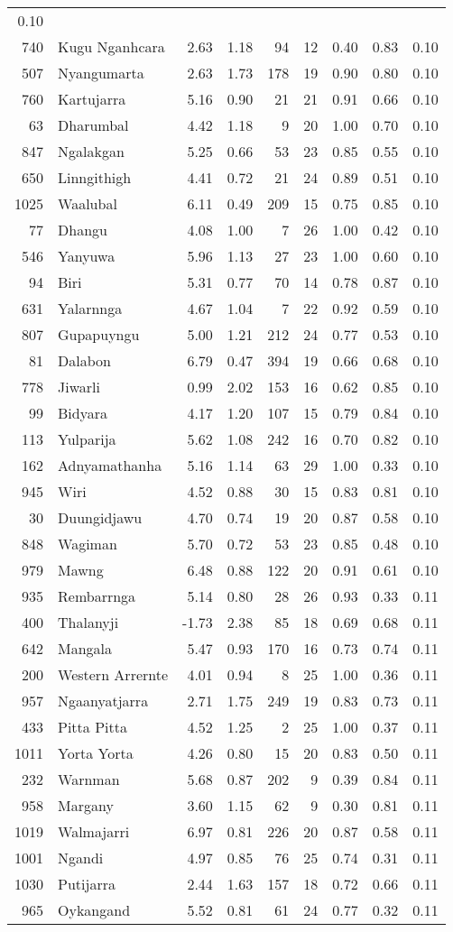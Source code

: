 \begin{longtable}[]{@{}rlrrrrrrr@{}}
0.10\tabularnewline
740 & Kugu Nganhcara & 2.63 & 1.18 & 94 & 12 & 0.40 & 0.83 &
0.10\tabularnewline
507 & Nyangumarta & 2.63 & 1.73 & 178 & 19 & 0.90 & 0.80 &
0.10\tabularnewline
760 & Kartujarra & 5.16 & 0.90 & 21 & 21 & 0.91 & 0.66 &
0.10\tabularnewline
63 & Dharumbal & 4.42 & 1.18 & 9 & 20 & 1.00 & 0.70 &
0.10\tabularnewline
847 & Ngalakgan & 5.25 & 0.66 & 53 & 23 & 0.85 & 0.55 &
0.10\tabularnewline
650 & Linngithigh & 4.41 & 0.72 & 21 & 24 & 0.89 & 0.51 &
0.10\tabularnewline
1025 & Waalubal & 6.11 & 0.49 & 209 & 15 & 0.75 & 0.85 &
0.10\tabularnewline
77 & Dhangu & 4.08 & 1.00 & 7 & 26 & 1.00 & 0.42 & 0.10\tabularnewline
546 & Yanyuwa & 5.96 & 1.13 & 27 & 23 & 1.00 & 0.60 &
0.10\tabularnewline
94 & Biri & 5.31 & 0.77 & 70 & 14 & 0.78 & 0.87 & 0.10\tabularnewline
631 & Yalarnnga & 4.67 & 1.04 & 7 & 22 & 0.92 & 0.59 &
0.10\tabularnewline
807 & Gupapuyngu & 5.00 & 1.21 & 212 & 24 & 0.77 & 0.53 &
0.10\tabularnewline
81 & Dalabon & 6.79 & 0.47 & 394 & 19 & 0.66 & 0.68 &
0.10\tabularnewline
778 & Jiwarli & 0.99 & 2.02 & 153 & 16 & 0.62 & 0.85 &
0.10\tabularnewline
99 & Bidyara & 4.17 & 1.20 & 107 & 15 & 0.79 & 0.84 &
0.10\tabularnewline
113 & Yulparija & 5.62 & 1.08 & 242 & 16 & 0.70 & 0.82 &
0.10\tabularnewline
162 & Adnyamathanha & 5.16 & 1.14 & 63 & 29 & 1.00 & 0.33 &
0.10\tabularnewline
945 & Wiri & 4.52 & 0.88 & 30 & 15 & 0.83 & 0.81 & 0.10\tabularnewline
30 & Duungidjawu & 4.70 & 0.74 & 19 & 20 & 0.87 & 0.58 &
0.10\tabularnewline
848 & Wagiman & 5.70 & 0.72 & 53 & 23 & 0.85 & 0.48 &
0.10\tabularnewline
979 & Mawng & 6.48 & 0.88 & 122 & 20 & 0.91 & 0.61 & 0.10\tabularnewline
935 & Rembarrnga & 5.14 & 0.80 & 28 & 26 & 0.93 & 0.33 &
0.11\tabularnewline
400 & Thalanyji & -1.73 & 2.38 & 85 & 18 & 0.69 & 0.68 &
0.11\tabularnewline
642 & Mangala & 5.47 & 0.93 & 170 & 16 & 0.73 & 0.74 &
0.11\tabularnewline
200 & Western Arrernte & 4.01 & 0.94 & 8 & 25 & 1.00 & 0.36 &
0.11\tabularnewline
957 & Ngaanyatjarra & 2.71 & 1.75 & 249 & 19 & 0.83 & 0.73 &
0.11\tabularnewline
433 & Pitta Pitta & 4.52 & 1.25 & 2 & 25 & 1.00 & 0.37 &
0.11\tabularnewline
1011 & Yorta Yorta & 4.26 & 0.80 & 15 & 20 & 0.83 & 0.50 &
0.11\tabularnewline
232 & Warnman & 5.68 & 0.87 & 202 & 9 & 0.39 & 0.84 &
0.11\tabularnewline
958 & Margany & 3.60 & 1.15 & 62 & 9 & 0.30 & 0.81 & 0.11\tabularnewline
1019 & Walmajarri & 6.97 & 0.81 & 226 & 20 & 0.87 & 0.58 &
0.11\tabularnewline
1001 & Ngandi & 4.97 & 0.85 & 76 & 25 & 0.74 & 0.31 &
0.11\tabularnewline
1030 & Putijarra & 2.44 & 1.63 & 157 & 18 & 0.72 & 0.66 &
0.11\tabularnewline
965 & Oykangand & 5.52 & 0.81 & 61 & 24 & 0.77 & 0.32 &
0.11\tabularnewline

\end{longtable}
